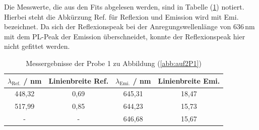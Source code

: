 Die Messwerte, die aus den Fits abgelesen werden, sind in Tabelle (\ref{tab:auf2a}) notiert.
Hierbei steht die Abk\"{u}rzung Ref. f\"{u}r Reflexion und Emission wird mit Emi. bezeichnet.
Da sich der Reflexionspeak bei der Anregungswellenl\"{a}nge von $636 \, \text{nm}$ mit dem PL-Peak der Emission \"{u}berschneidet, konnte der Reflexionspeak hier nicht gefittet werden.
\begin{table}
	\centering
	\caption{Messergebnisse der Probe 1 zu Abbildung (\ref{abb:auf2P1})}
\begin{tabular}{|cccc|}
	\hline
	{$\lambda_{\text{Ref.}}$ / nm}	&	{Linienbreite Ref.}	&	{$\lambda_{\text{Emi.}}$ / nm}	&	{Linienbreite Emi.}	\\
	\hline
	448,32 & 0,69 & 645,31 & 18,47 \\
	517,99 & 0,85 & 644,23 & 15,73 \\
	- & - & 646,68 & 15,67 \\
	\hline
	\end{tabular}
\label{tab:auf2a}
\end{table}

